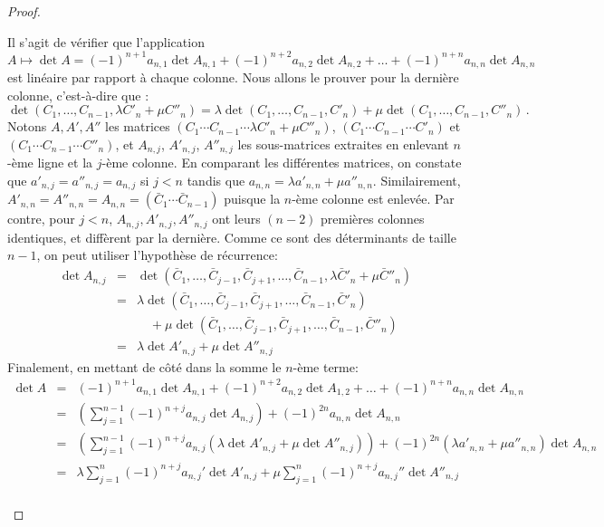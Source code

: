 \documentclass[class=report,crop=false]{standalone}
\begin{document}
\begin{proof}
\begin{itemize}
Il s'agit de vérifier que l'application
\[
A \mapsto \det A = (-1)^{n+1}a_{n,1}\det A_{n,1}+(-1)^{n+2} a_{n,2}\det A_{n,2}
+ \dots + (-1)^{n+n}a_{n,n}\det A_{n,n}
\]
est linéaire par rapport à chaque colonne. Nous allons le prouver pour la dernière colonne,
c'est-à-dire que :
\[
\det (C_1,\ldots,C_{n-1},\lambda C'_n + \mu C''_n)
 =  \lambda \det (C_1,\ldots, C_{n-1},C'_n) + \mu \det (C_1,\ldots,C_{n-1},C''_n) \, .
\]
Notons $A,A',A''$ les matrices $(C_1 \cdots C_{n-1} \cdots \lambda C'_n + \mu C''_n)$,
$(C_1 \cdots C_{n-1} \cdots C'_n)$ et $(C_1 \cdots C_{n-1} \cdots C''_n)$, et
$A_{n,j}$, $A'_{n,j}$, $A''_{n,j}$ les sous-matrices extraites en enlevant $n$-ème ligne
et la $j$-ème colonne. En comparant les différentes matrices, on constate que
$a'_{n,j} = a''_{n,j} = a_{n,j}$ si $j < n$ tandis que $a_{n,n} = \lambda a'_{n,n} + \mu a''_{n,n}$.
Similairement, $A'_{n,n} = A''_{n,n} = A_{n,n} = (\bar{C}_1 \cdots \bar{C}_{n-1})$
puisque la $n$-ème colonne est enlevée.
Par contre, pour $j < n$, $A_{n,j}, A'_{n,j}, A''_{n,j}$ ont leurs $(n-2)$ premières colonnes
identiques, et diffèrent par la dernière. Comme ce sont des déterminants de taille $n-1$, on peut utiliser l'hypothèse de récurrence:
\begin{eqnarray*}
\det A_{n,j} &=&
\det (\bar{C}_1, \ldots, \bar{C}_{j-1}, \bar{C}_{j+1}, \ldots, \bar{C}_{n-1},
\lambda \bar{C}'_n + \mu \bar{C}''_n)
\\
&=& \lambda \det (\bar{C}_1, \ldots, \bar{C}_{j-1}, \bar{C}_{j+1}, \ldots, \bar{C}_{n-1}, \bar{C}'_n) \\
&& \quad + \mu \det (\bar{C}_1, \ldots, \bar{C}_{j-1}, \bar{C}_{j+1}, \ldots, \bar{C}_{n-1}, \bar{C}''_n)
\\
&=& \lambda \det A'_{n,j} + \mu \det A''_{n,j}
\end{eqnarray*}
Finalement, en mettant de côté dans la somme le $n$-ème terme:
{\small
\begin{eqnarray*}
\det A &=& (-1)^{n+1} a_{n,1}\det A_{n,1}+(-1)^{n+2} a_{n,2}\det A_{1,2}
+ \dots + (-1)^{n+n} a_{n,n}\det A_{n,n}
\\
&=& \left( \sum_{j=1}^{n-1} (-1)^{n+j} a_{n,j} \det A_{n,j} \right) + (-1)^{2 n} a_{n,n}\det A_{n,n}
\\
&=& \left( \sum_{j=1}^{n-1} (-1)^{n+j} a_{n,j} (\lambda \det A'_{n,j} + \mu \det A''_{n,j}) \right)
+ (-1)^{2 n} (\lambda a'_{n,n} + \mu a''_{n,n}) \det A_{n,n}
\\
&=& \lambda \sum_{j=1}^n (-1)^{n+j} a_{n,j}' \det A'_{n,j}
+ \mu \sum_{j=1}^n (-1)^{n+j} a_{n,j}'' \det A''_{n,j}
\\

\end{eqnarray*}}
\end{itemize}
\end{proof}
\end{document}
